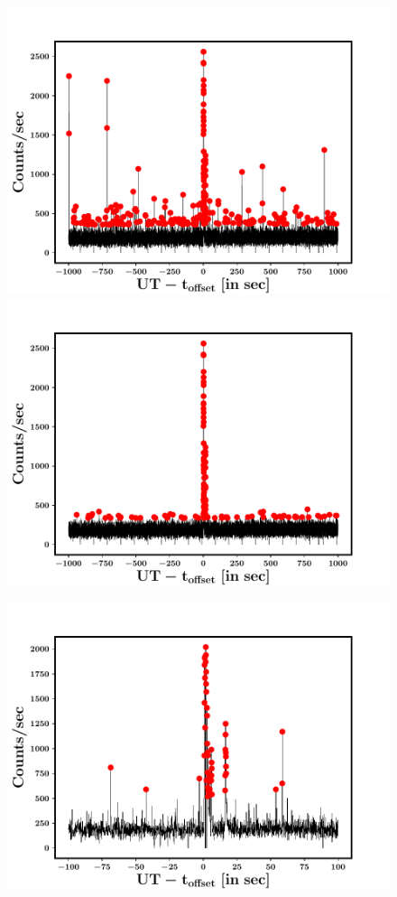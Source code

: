 \begin{figure}
\begin{center}
\includegraphics[scale=0.42]{GRB160802A--Q1--DPHclean_before}
\includegraphics[scale=0.42]{GRB160802A--Q1--DPHclean_after}
\end{center}
\begin{center}
\includegraphics[scale=0.42]{GRB160802A--Q0--DPHclean_before--zoom}

\end{center}
\end{figure}
